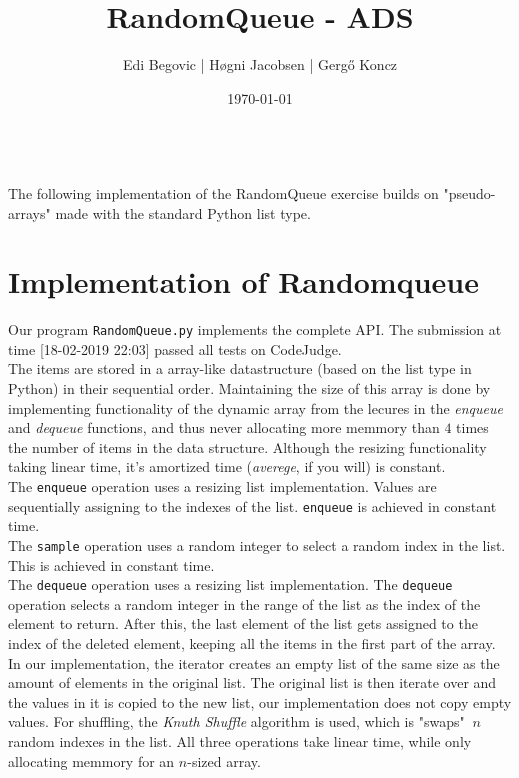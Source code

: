 \documentclass[a4paper]{article}
\title{RandomQueue - ADS}
\author{Edi Begovic | Høgni Jacobsen | Gergő Koncz}
\date{\today}
\begin{document}
 
\maketitle

\ \\
\noindent
The following implementation of the RandomQueue exercise builds on "pseudo-arrays" made 
with the standard Python list type.
\ \\
\section*{Implementation of Randomqueue}

\noindent
Our program \texttt{RandomQueue.py} implements the complete API.
The submission at time [18-02-2019 22:03] passed all tests on CodeJudge. \\

The items are stored in a array-like datastructure (based on the list type in Python) in 
their sequential order. Maintaining the size of this array is done by implementing functionality of
the dynamic array from the lecures in the \textit{enqueue} and \textit{dequeue} functions, and 
thus never allocating more memmory than $4$ times the number of items in the data structure. 
Although the resizing functionality taking linear time, it's amortized time (\textit{averege}, if you will)
is constant.\\

The \texttt{enqueue}  operation uses  a resizing list implementation. Values are sequentially 
assigning to the indexes of the list.
\texttt{enqueue} is achieved in constant time. \\

The \texttt{sample} operation uses a random integer to select a random index in the list. This is 
achieved in constant time. \\

The \texttt{dequeue} operation uses a resizing list implementation. The \texttt{dequeue} 
operation selects a random integer in the range of the list as the index of the element to 
return. After this, the last element of the list gets assigned to the index of the deleted 
element, keeping all the items in the first part of the array.  \\

In our implementation, the iterator creates an empty list of the same size as the amount of 
elements in the original list. The original list is then iterate over and the values in it 
is copied to the new list, our implementation does not copy empty values. For shuffling, the 
\textit{Knuth Shuffle} algorithm is used, which is "swaps" $~n$ random indexes in the list.
All three operations take linear time, while only allocating memmory for an $n$-sized array. \\
\end{document}
